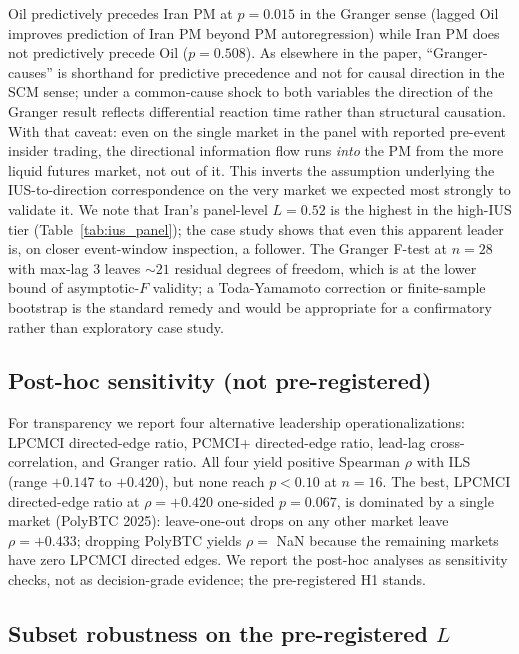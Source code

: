 \documentclass{article}
\begin{document}
Oil predictively precedes Iran PM at $p = 0.015$ in the Granger sense (lagged Oil improves prediction of Iran PM beyond PM autoregression) while Iran PM does not predictively precede Oil ($p = 0.508$). As elsewhere in the paper, ``Granger-causes'' is shorthand for predictive precedence and not for causal direction in the SCM sense; under a common-cause shock to both variables the direction of the Granger result reflects differential reaction time rather than structural causation. With that caveat: even on the single market in the panel with reported pre-event insider trading, the directional information flow runs \emph{into} the PM from the more liquid futures market, not out of it. This inverts the assumption underlying the IUS-to-direction correspondence on the very market we expected most strongly to validate it. We note that Iran's panel-level $L = 0.52$ is the highest in the high-IUS tier (Table~\ref{tab:ius_panel}); the case study shows that even this apparent leader is, on closer event-window inspection, a follower. The Granger F-test at $n = 28$ with max-lag $3$ leaves $\sim 21$ residual degrees of freedom, which is at the lower bound of asymptotic-$F$ validity; a Toda-Yamamoto correction or finite-sample bootstrap is the standard remedy and would be appropriate for a confirmatory rather than exploratory case study.

\subsection{Post-hoc sensitivity (not pre-registered)}

For transparency we report four alternative leadership operationalizations: LPCMCI directed-edge ratio, PCMCI+ directed-edge ratio, lead-lag cross-correlation, and Granger ratio. All four yield positive Spearman $\rho$ with ILS (range $+0.147$ to $+0.420$), but none reach $p < 0.10$ at $n = 16$. The best, LPCMCI directed-edge ratio at $\rho = +0.420$ one-sided $p = 0.067$, is dominated by a single market (PolyBTC 2025): leave-one-out drops on any other market leave $\rho = +0.433$; dropping PolyBTC yields $\rho =$ NaN because the remaining markets have zero LPCMCI directed edges. We report the post-hoc analyses as sensitivity checks, not as decision-grade evidence; the pre-registered H1 stands.

\subsection{Subset robustness on the pre-registered $L$}
\label{sec:subset_robustness}
\end{document}
